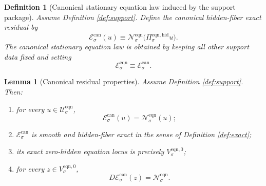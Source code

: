 \documentclass[11pt]{article}
\newcommand{\EqnSpace}[1]{\mathcal U_{#1}^{\mathrm{eqn}}}
\newcommand{\EqnResidual}[1]{\mathcal E_{#1}^{\mathrm{eqn}}}
\newcommand{\EqnResidualCan}[1]{\mathcal E_{#1}^{\mathrm{can}}}
\newcommand{\EqnZero}[1]{V_{#1}^{\mathrm{eqn},0}}
\newcommand{\EqnProj}[1]{\Pi_{#1}^{\mathrm{eqn,hid}}}
\newcommand{\EqnLin}[1]{\mathcal N_{#1}^{\mathrm{eqn}}}
\newtheorem{definition}{Definition}
\newtheorem{lemma}{Lemma}
\begin{document}
\begin{definition}[Canonical stationary equation law induced by the support package]
\label{def:canonical}
Assume Definition \ref{def:support}. Define the canonical hidden-fiber exact residual by
\begin{equation}
\EqnResidualCan{\sigma}(u)
\equiv
\EqnLin{\sigma}\bigl(\EqnProj{\sigma}u\bigr).
\label{eq:canresidual}
\end{equation}
The canonical stationary equation law is obtained by keeping all other support data fixed and setting
\[
\EqnResidual{\sigma}\equiv\EqnResidualCan{\sigma}.
\]
\end{definition}

\begin{lemma}[Canonical residual properties]
\label{lem:canonical}
Assume Definition \ref{def:support}. Then:
\begin{enumerate}
    \item for every \(u\in\EqnSpace{\sigma}\),
    \begin{equation}
    \EqnResidualCan{\sigma}(u)=\EqnLin{\sigma}(u);
    \label{eq:canlin}
    \end{equation}
    \item \(\EqnResidualCan{\sigma}\) is smooth and hidden-fiber exact in the sense of Definition \ref{def:exact};
    \item its exact zero-hidden equation locus is precisely \(\EqnZero{\sigma}\);
    \item for every \(z\in\EqnZero{\sigma}\),
    \[
    D\EqnResidualCan{\sigma}(z)=\EqnLin{\sigma}.
    \]
\end{enumerate}
\end{lemma}
\end{document}

